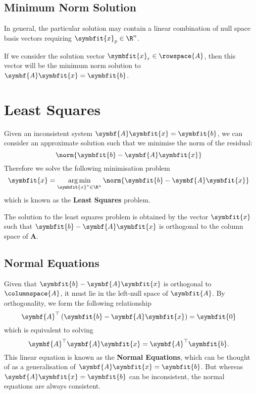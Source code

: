 \documentclass{article}
\DeclareMathOperator*{\argmin}{arg\,min}
\begin{document}
\subsection{Minimum Norm Solution}
In general, the particular solution may contain a linear combination of
null space basis vectors requiring \(\symbfit{x}_p \in \R^n\).

If we consider the solution vector \(\symbfit{x}_r \in \rowspace{A}\), then this vector
will be the minimum norm solution to \(\symbf{A}\symbfit{x} = \symbfit{b}\).
\section{Least Squares}
Given an inconsistent system \(\symbf{A}\symbfit{x} = \symbfit{b}\), we can consider an approximate solution such that we
minimise the norm of the residual:
\begin{equation*}
    \norm{\symbfit{b} - \symbf{A}\symbfit{x}}
\end{equation*}
Therefore we solve the following minimisation problem
\begin{equation*}
    \symbfit{x} = \argmin_{\symbfit{x}^\ast \in \R^n} \norm{\symbfit{b} - \symbf{A}\symbfit{x}}
\end{equation*}
which is known as the \textbf{Least Squares} problem.
\begin{theorem}
    The solution to the least squares problem is obtained by the vector \(\symbfit{x}\) such
    that \(\symbfit{b} - \symbf{A}\symbfit{x}\) is orthogonal to the column space of \(\symbf{A}\).
\end{theorem}
\subsection{Normal Equations}
Given that \(\symbfit{b} - \symbf{A}\symbfit{x}\) is orthogonal to \(\columnspace{A}\), it must lie in the
left-null space of \(\symbfit{A}\). By orthogonality, we form the following relationship
\begin{equation*}
    \symbf{A}^\top \left( \symbfit{b} - \symbf{A}\symbfit{x} \right) = \symbfit{0}
\end{equation*}
which is equivalent to solving
\begin{equation*}
    \symbf{A}^\top \symbf{A}\symbfit{x} = \symbf{A}^\top \symbfit{b}.
\end{equation*}
This linear equation is known as the \textbf{Normal Equations}, which can be thought of as
a \linebreak generalisation of \(\symbf{A}\symbfit{x} = \symbfit{b}\). But whereas \(\symbf{A}\symbfit{x} = \symbfit{b}\)
can be inconsistent, the normal equations are always consistent.
\end{document}
